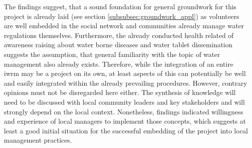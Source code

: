 The findings suggest, that a sound foundation for general groundwork for this project is already laid (see section \ref{subsubsec:groundwork_appl}) as volunteers are well embedded in the social network and communities already manage water regulations themselves. Furthermore, the already conducted health related  of awareness raising about water borne diseases and water tablet dissemination suggests the assumption, that general familiarity with the topic of water management also already exists. Therefore, while the integration of an entire \acrshort{iwrm} may be a project on its own, at least aspects of this can potentially be well and easily integrated within the already prevailing procedures. However, contrary opinions must not be disregarded here either. The synthesis of knowledge will need to be discussed with local community leaders and key stakeholders and will strongly depend on the local context. Nonetheless, findings indicated willingness and experience of local managers to implement those concepts, which suggests at least a good initial situation for the successful embedding of the project into local management practices.

